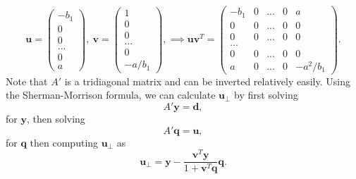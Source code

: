 \documentclass{article}
\let\vec\boldsymbol
\begin{document}
\[\vec{u} = \begin{pmatrix}
-b_1 \\
0 \\
0 \\
... \\
0 \\
a
\end{pmatrix},\ \vec{v} = \begin{pmatrix}
1 \\
0 \\
0 \\
... \\
0 \\
-a/b_1
\end{pmatrix},
\implies \vec{u}\vec{v}^T = 
\begin{pmatrix}
-b_1 & 0 & ... & 0 & a \\
0    & 0 & ... & 0 & 0 \\
0    & 0 & ... & 0 & 0 \\
... \\
0 & 0 & ... & 0 & 0 \\
a & 0 & ... & 0 & -a^2 / b_1  
\end{pmatrix}.\]
Note that $A'$ is a tridiagonal matrix and can be inverted relatively easily. Using the Sherman-Morrison formula, we can calculate $\vec{u}_\perp$ by first solving
\[A'\vec{y} = \vec{d},\]
for $\vec{y}$, then solving
\[A' \vec{q} = \vec{u},\]
for $\vec{q}$ then computing $\vec{u}_\perp$ as
\[\vec{u}_\perp = \vec{y} - \frac{\vec{v}^T\vec{y}}{1+\vec{v}^T\vec{q}}\vec{q}.\]
\end{document}
